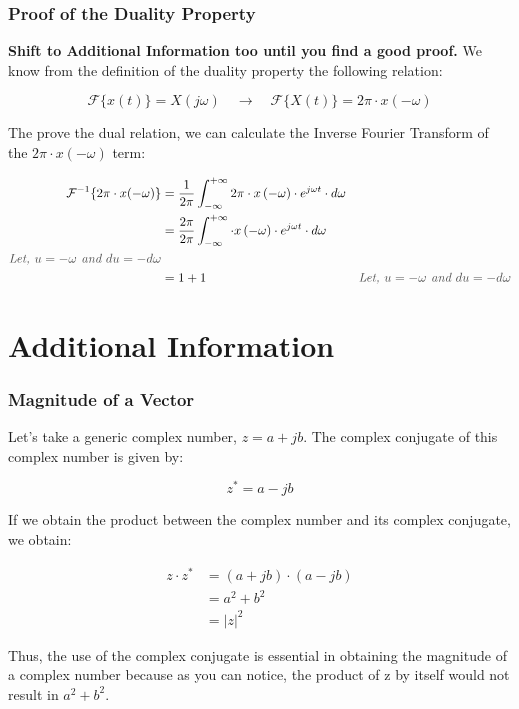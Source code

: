 \documentclass[letterpaper,12pt]{article}
\newcommand{\annot}[1]{\textcolor{darkgray}{\textit{#1}}}
\begin{document}
\subsubsection*{Proof of the Duality Property}
\textbf{Shift to Additional Information too until you find a good proof.}
We know from the definition of the duality property the following relation:

\[\mathcal{F}\{x(t)\} = X(j\omega) \quad \rightarrow \quad \mathcal{F}\{X(t)\} = 2\pi\cdot x(-\omega)\]

The prove the dual relation, we can calculate the Inverse Fourier Transform of the $2\pi\cdot x(-\omega)$ term:

\begin{equation*}
    \begin{aligned}
        \mathcal{F}^{-1}\{2\pi\cdot x(-\omega)\} & = \frac{1}{2\pi}\int_{-\infty}^{+\infty}2\pi\cdot x\left(-\omega\right)\cdot e^{j\omega t}\cdot d\omega                                                \\
                                                 & = \frac{2\pi}{2\pi}\int_{-\infty}^{+\infty}\cdot x\left(-\omega\right)\cdot e^{j\omega t}\cdot d\omega                                                 \\
        \annot{Let, $u = -\omega$ and $du=-d\omega$}                                                                                                                                                      \\
                                                 & = 1+ 1                                                                                                  & \annot{Let, $u = -\omega$ and $du=-d\omega$}
    \end{aligned}
\end{equation*}

\newpage
\section*{Additional Information}
\subsubsection*{Magnitude of a Vector}\label{sec:magnitude_vector}

Let's take a generic complex number, $z = a + jb$. The complex conjugate of this complex number is given by:

\[z^{*} = a - jb\]

If we obtain the product between the complex number and its complex conjugate, we obtain:

\begin{align*}
    z\cdot z^{*} & = (a + jb)\cdot (a - jb) \\
                 & = a^2 + b^2              \\
                 & = |z|^2
    \label{eq:complex_conjugate}
\end{align*}

Thus, the use of the complex conjugate is essential in obtaining the magnitude of a complex number because as you can notice, the product of z by itself would not result in $a^2 + b^2$.
\end{document}
